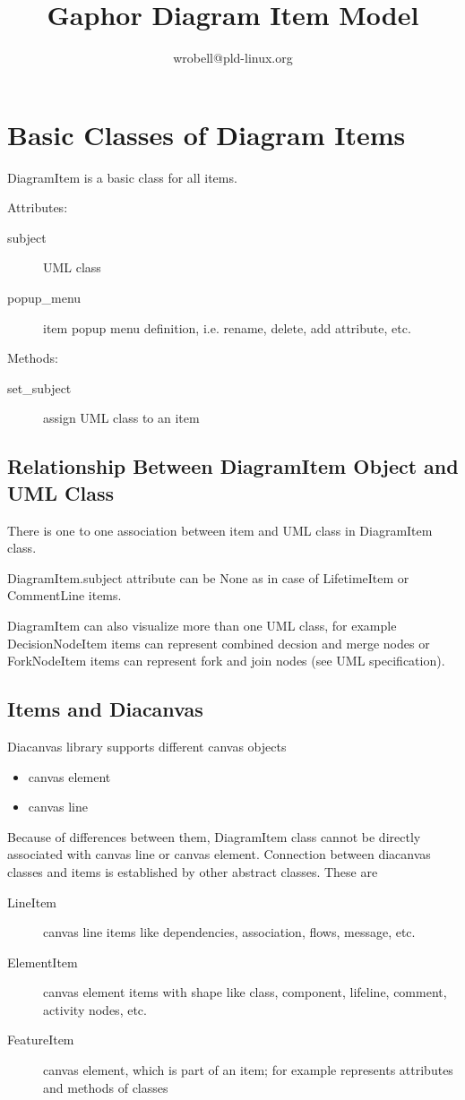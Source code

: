 \documentclass{article}
\title{Gaphor Diagram Item Model}
\author{wrobell@pld-linux.org}
\begin{document}
\maketitle

\section{Basic Classes of Diagram Items}

DiagramItem is a basic class for all items.

Attributes:
\begin{description}
\item[subject] UML class
\item[popup\_menu] item popup menu definition, i.e. rename, delete, add
  attribute, etc.
\end{description}

Methods:
\begin{description}
\item[set\_subject] assign UML class to an item
\end{description}

\subsection{Relationship Between DiagramItem Object and UML Class}

There is one to one association between item and UML class in DiagramItem
class.

DiagramItem.subject attribute can be None as in case of LifetimeItem or
CommentLine items.

DiagramItem can also visualize more than one UML class, for example
DecisionNodeItem items can represent combined decsion and merge nodes or
ForkNodeItem items can represent fork and join nodes (see UML
specification).

\subsection{Items and Diacanvas}
Diacanvas library supports different canvas objects
\begin{itemize}
\item canvas element
\item canvas line
\end{itemize}

Because of differences between them, DiagramItem class cannot be directly
associated with canvas line or canvas element. Connection between diacanvas
classes and items is established by other abstract classes. These are
\begin{description}
\item[LineItem]
    canvas line items like dependencies, association, flows, message, etc.

\item[ElementItem]
    canvas element items with shape like class, component, lifeline,
    comment, activity nodes, etc.
            
\item[FeatureItem]
    canvas element, which is part of an item; for example represents
    attributes and methods of classes 
\end{description}
\end{document}
